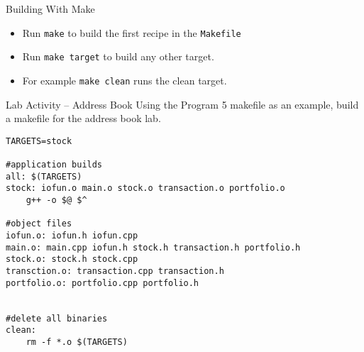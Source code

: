 \documentclass[]{beamer}
\begin{document}
\begin{frame}{Building With Make}
    \begin{itemize}[<+->]
        \item Run \texttt{make} to build the first recipe in the
            \texttt{Makefile}
        \item Run \texttt{make target} to build any other target.
        \item For example \texttt{make clean} runs the clean target.
    \end{itemize}
\end{frame}

\begin{frame}[fragile]{Lab Activity -- Address Book}
    Using the Program 5 makefile as an example, build a makefile for
    the address book lab.
\begin{adjustbox}{max width=\textwidth, max totalheight=0.9\textheight}
\begin{BVerbatim}
TARGETS=stock

#application builds
all: $(TARGETS)
stock: iofun.o main.o stock.o transaction.o portfolio.o
	g++ -o $@ $^

#object files
iofun.o: iofun.h iofun.cpp
main.o: main.cpp iofun.h stock.h transaction.h portfolio.h
stock.o: stock.h stock.cpp
transction.o: transaction.cpp transaction.h
portfolio.o: portfolio.cpp portfolio.h


#delete all binaries
clean:
	rm -f *.o $(TARGETS)
\end{BVerbatim}
\end{adjustbox}
\end{frame}
\end{document}
